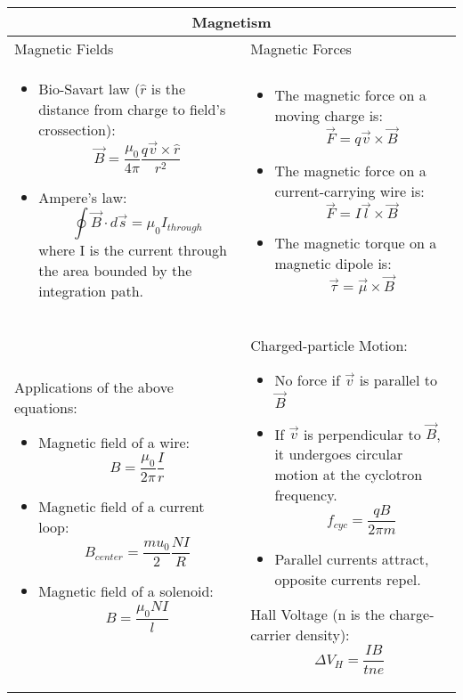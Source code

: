 \documentclass{article}
\begin{document}
\begin{center}
	\begin{tabular}{|p{8cm}|p{8cm}|}
		\hline
		\multicolumn{2}{|c|}{Magnetism}                                                     \\
		\hline

		Magnetic Fields & Magnetic Forces                                                   \\

		\begin{itemize}
			\item Bio-Savart law ($ \hat{r}$ is the distance from charge to field's crossection):
			      \[ \vec{B} = \frac{\mu_0}{4\pi} \frac{q\vec{v} \times \hat{r}}{r^2} \]
			\item Ampere's law:
			      \[ \oint \vec{B} \cdot d \vec{s} = \mu_0 I_{through} \]
			      where I is the current through the area bounded by the integration path.

		\end{itemize}

		                &

		\begin{itemize}
			\item The magnetic force on a moving charge is:
			      \[ \vec{F} = q\vec{v} \times \vec{B} \]
			\item The magnetic force on a current-carrying wire is:
			      \[ \vec{F} = I\vec{l} \times \vec{B} \]
			\item The magnetic torque on a magnetic dipole is:
			      \[ \vec{\tau} = \vec{\mu} \times \vec{B}\]
		\end{itemize} \\
		\hline

		Applications of the above equations:
		\begin{itemize}
			\item Magnetic field of a wire:
			      \[B = \frac{\mu_0}{2\pi} \frac{I}{r}\]
			\item Magnetic field of a current loop:
			      \[B_{center} = \frac{mu_0}{2}\frac{NI}{R}\]
			\item Magnetic field of a solenoid:
			      \[B = \frac{\mu_0NI}{l}\]
		\end{itemize}

		                &

		Charged-particle Motion:
		\begin{itemize}
			\item No force if $\vec{v}$ is parallel to $\vec{B}$
			\item If $\vec{v}$ is perpendicular to $\vec{B}$, it undergoes circular motion at the cyclotron frequency.
			      \[ f_{cyc} = \frac{qB}{2\pi m}\]
			\item Parallel currents attract, opposite currents repel.
		\end{itemize}

		Hall Voltage (n is the charge-carrier density):
		\[ \Delta V_H = \frac{IB}{tne}\]                                                    \\
		\hline
	\end{tabular}
\end{center}
\end{document}
